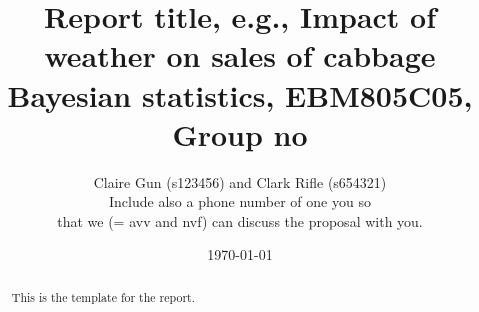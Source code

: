 \documentclass[a4paper,11pt]{article}
\author{Claire Gun (s123456) and Clark Rifle (s654321) \\
  Include also a phone number of one you so\\
  that we (= avv and nvf) can discuss the proposal with you.}
\date{\today}
\title{Report title, e.g., Impact of weather on sales of cabbage\\
  Bayesian statistics, EBM805C05,  Group no}
\theoremstyle{definition}
\numberwithin{equation}{section}
\newcommand{\1}[1]{\,I_{#1}} %
\begin{document}
\maketitle

\begin{abstract}
  This is the template for the report.
\end{abstract}








\appendix



\end{document}
